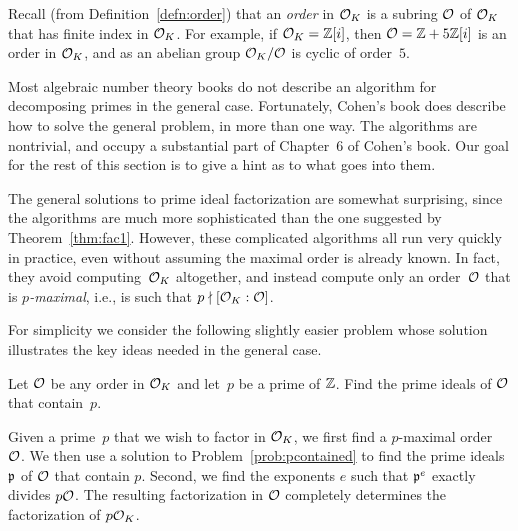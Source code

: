 Recall (from Definition~\ref{defn:order}) that an {\em order} in $\mathcal{O}_K$ is
a subring $\mathcal{O}$ of $\mathcal{O}_K$ that has finite index in $\mathcal{O}_K$.  For
example, if $\mathcal{O}_K=\mathbb{Z}[i]$, then $\mathcal{O}=\mathbb{Z} + 5\mathbb{Z}[i]$ is an order in $\mathcal{O}_K$,
and as an abelian group $\mathcal{O}_K/\mathcal{O}$ is cyclic of order~$5$.

Most algebraic number theory books do not describe an algorithm for
decomposing primes in the general case.  Fortunately, Cohen's book
\cite[Ch.~6]{cohen:course_ant} does describe how to solve the general
problem, in more than one way.  The algorithms are nontrivial, and
occupy a substantial part of Chapter~6 of Cohen's book.  Our goal
for the rest of this section is to give a hint as to what goes into them.

The general solutions to prime ideal factorization are somewhat surprising,
since the algorithms are much more sophisticated than the one
suggested by Theorem~\ref{thm:fac1}.  However, these complicated
algorithms all run very quickly in practice, even without assuming the
maximal order is already known.  In fact, they avoid computing~$\mathcal{O}_K$
altogether, and instead compute only an order~$\mathcal{O}$ that is {\em
  $p$-maximal}, i.e., is such that $p \nmid [\mathcal{O}_K:\mathcal{O}]$.

For simplicity we consider the following slightly easier problem whose
solution illustrates the key ideas needed in the general case.
\begin{problem}\label{prob:pcontained}
Let $\mathcal{O}$ be any order in $\mathcal{O}_K$
and let~$p$ be a prime of $\mathbb{Z}$.  Find the prime ideals of $\mathcal{O}$ that
contain~$p$.
\end{problem}

Given a prime~$p$
that we wish to factor in $\mathcal{O}_K$, we first find a $p$-maximal order~$\mathcal{O}$.
We then use a solution to Problem~\ref{prob:pcontained} to find
the prime ideals $\mathfrak{p}$ of $\mathcal{O}$ that contain $p$.  Second, we find
the exponents $e$ such that $\mathfrak{p}^e$ exactly divides $p\mathcal{O}$.
The resulting factorization in $\mathcal{O}$ completely determines
the factorization of $p\mathcal{O}_K$.  

